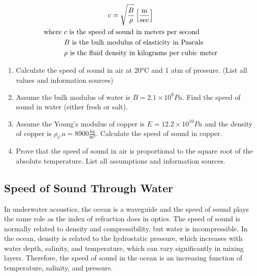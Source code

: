 \begin{gather} \labeq{speed_of_sound_fluid_general}
    c = \sqrt{\frac{B}{\rho}} \left[\frac{\text{m}}{\text{sec}}\right] \\    
    \begin{aligned}
        \text{where }   &c \text{ is the speed of sound in meters per second} \\
                        &B \text{ is the bulk modulus of elasticity in Pascals} \\
                        &\rho \text{ is the fluid density in kilograms per cubic meter} \\
    \end{aligned} \notag
\end{gather}


\begin{kaobox}[frametitle=Homework 1]
    \begin{enumerate}
        \item Calculate the speed of sound in air at 20°C and 1 atm of pressure. (List all values and information sources)
        \item Assume the bulk modulus of water is $B = 2.1 \times 10^9 Pa$. Find the speed of sound in water (either fresh or salt).
        \item Assume the Young's modulus of copper is $E = 12.2 \times 10^10 Pa$ and the density of copper is $\rho_Cu = 8900 \frac{\text{kg}}{\text{m}^3}$. Calculate the speed of sound in copper.
        \item Prove that the speed of sound in air is proportional to the square root of the absolute temperature. List all assumptions and information sources.
    \end{enumerate}
\end{kaobox}

    \subsection{Speed of Sound Through Water}
    In underwater acoustics, the ocean is a waveguide and the speed of sound plays the same role as the index of refraction does in optics.
    The speed of sound is normally related to density and compressibility, but water is incompressible.
    In the ocean, density is related to the hydrostatic pressure, which increases with water depth, salinity, and temperature, which can vary significantly in mixing layers.
    Therefore, the speed of sound in the ocean is an increasing function of temperature, salinity, and pressure.

